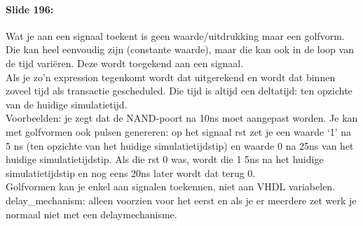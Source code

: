 \documentclass[10pt,a4paper]{book}
\begin{document}
\paragraph{Slide 196:} Wat je aan een signaal toekent is geen waarde/uitdrukking maar een golfvorm. Die kan heel eenvoudig zijn (constante waarde), maar die kan ook in de loop van de tijd vari\"eren. Deze wordt toegekend aan een signaal.\\
Als je zo'n expression tegenkomt wordt dat uitgerekend en wordt dat binnen zoveel tijd als transactie gescheduled. Die tijd is altijd een deltatijd: ten opzichte van de huidige simulatietijd.\\
Voorbeelden: je zegt dat de NAND-poort na 10ns moet aangepast worden. Je kan met golfvormen ook pulsen genereren: op het signaal rst zet je een waarde `1' na 5 ns (ten opzichte van het huidige simulatietijdstip) en waarde 0 na 25ns van het huidige simulatietijdstip. Als die rst 0 was, wordt die 1 5ns na het huidige simulatietijdstip en nog eens 20ns later wordt dat terug 0.\\
Golfvormen kan je enkel aan signalen toekennen, niet aan VHDL variabelen.\\
delay\_mechanism: alleen voorzien voor het eerst en als je er meerdere zet werk je normaal niet met een delaymechanisme.
\end{document}
